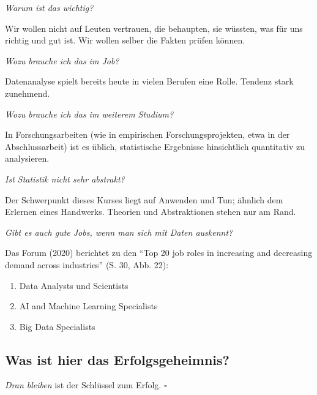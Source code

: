 \documentclass[
  a4paper,
  DIV=11]{scrreprt}
\providecommand{\tightlist}{%
  \setlength{\itemsep}{0pt}\setlength{\parskip}{0pt}}\usepackage{longtable,booktabs,array}
\begin{document}
\emph{Warum ist das wichtig?}

Wir wollen nicht auf Leuten vertrauen, die behaupten, sie wüssten, was
für uns richtig und gut ist. Wir wollen selber die Fakten prüfen können.

\emph{Wozu brauche ich das im Job?}

Datenanalyse spielt bereits heute in vielen Berufen eine Rolle. Tendenz
stark zunehmend.

\emph{Wozu brauche ich das im weiterem Studium?}

In Forschungsarbeiten (wie in empirischen Forschungsprojekten, etwa in
der Abschlussarbeit) ist es üblich, statistische Ergebnisse hinsichtlich
quantitativ zu analysieren.

\emph{Ist Statistik nicht sehr abstrakt?}

Der Schwerpunkt dieses Kurses liegt auf Anwenden und Tun; ähnlich dem
Erlernen eines Handwerks. Theorien und Abstraktionen stehen nur am Rand.

\emph{Gibt es auch gute Jobs, wenn man sich mit Daten auskennt?}

Das Forum (2020) berichtet zu den ``Top 20 job roles in increasing and
decreasing demand across industries'' (S. 30, Abb. 22):

\begin{enumerate}
\def\labelenumi{\arabic{enumi}.}
\tightlist
\item
  Data Analysts und Scientists
\item
  AI and Machine Learning Specialists
\item
  Big Data Specialists
\end{enumerate}

\subsection{Was ist hier das
Erfolgsgeheimnis?}\label{was-ist-hier-das-erfolgsgeheimnis}

\begin{tcolorbox}[enhanced jigsaw, toprule=.15mm, leftrule=.75mm, bottomrule=.15mm, opacitybacktitle=0.6, toptitle=1mm, coltitle=black, colback=white, rightrule=.15mm, left=2mm, colframe=quarto-callout-important-color-frame, breakable, title=\textcolor{quarto-callout-important-color}{\faExclamation}\hspace{0.5em}{Wichtig}, colbacktitle=quarto-callout-important-color!10!white, bottomtitle=1mm, titlerule=0mm, arc=.35mm, opacityback=0]

\emph{Dran bleiben} ist der Schlüssel zum Erfolg. \(\square\)

\end{tcolorbox}
\end{document}
